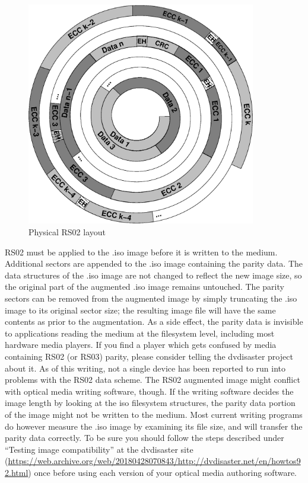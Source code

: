 \begin{figure}
 \begin{center}
 \includegraphics[width=10cm]{spiral-rs02.eps}
 \caption{Physical RS02 layout}
 \label{layout-phy-two}
 \end{center}
\end{figure}

RS02 must be applied to the .iso image before it is written to
the medium. Additional sectors are appended to the .iso image 
containing the parity data. The data structures of the .iso image
are not changed to reflect the new image size, so the original
part of the augmented .iso image remains untouched. The parity
sectors can be removed from the augmented image by simply 
truncating the .iso image to its original sector size; the resulting
image file will have the same contents as prior to the augmentation.
As a side effect, the parity data is invisible to applications reading
the medium at the filesystem level, including most hardware media
players. If you find a player which gets confused by media containing
RS02 (or RS03) parity, please consider telling the dvdisaster project about it. As of this writing,
not a single device has been reported to run into problems with
the RS02 data scheme. The RS02 augmented image might conflict with
optical media writing software, though. If the writing software
decides the image length by looking at the iso filesystem structures,
the parity data portion of the image might not be written to the medium.
Most current writing programs do however measure the .iso image by examining
its file size, and will transfer the parity data correctly. To be sure you
should follow the steps described under ``Testing image compatibility''
at the dvdisaster site (\url{https://web.archive.org/web/20180428070843/http://dvdisaster.net/en/howtos92.html}) once
before using each version of your optical media authoring software.

